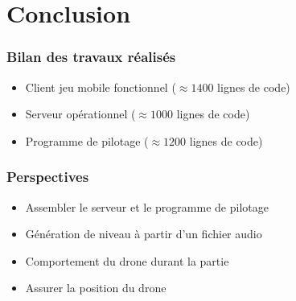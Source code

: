 \section{Conclusion}
\begin{frame}
\frametitle{Bilan des travaux réalisés}
\begin{center}
\begin{itemize}
\item Client jeu mobile fonctionnel ($\approx 1400$ lignes de code)
\item Serveur opérationnel ($\approx 1000$ lignes de code)
\item Programme de pilotage ($\approx 1200$ lignes de code)
\end{itemize}
\end{center}
\end{frame}

\begin{frame}
\frametitle{Perspectives}
\begin{center}
\begin{itemize}
\item Assembler le serveur et le programme de pilotage
\item Génération de niveau à partir d'un fichier audio
\item Comportement du drone durant la partie
\item Assurer la position du drone 
\end{itemize}
\end{center}
\end{frame}